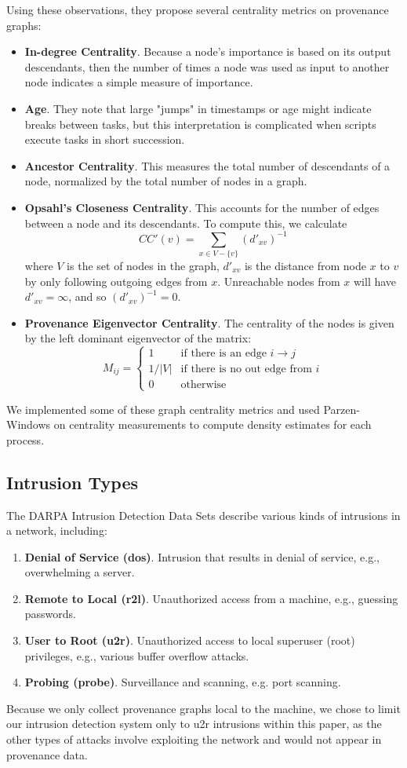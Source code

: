\documentclass[10pt,twocolumn]{article}
\begin{document}
Using these observations, they propose several centrality metrics on provenance graphs:
\begin{itemize}
\item \textbf{In-degree Centrality}. Because a node's importance is based on its output descendants, then the number of times a node was used as input to another node indicates a simple measure of importance.
\item \textbf{Age}. They note that large "jumps" in timestamps or age might indicate breaks between tasks, but this interpretation is complicated when scripts execute tasks in short succession.
\item \textbf{Ancestor Centrality}. This measures the total number of descendants of a node, normalized by the total number of nodes in a graph.
\item \textbf{Opsahl's Closeness Centrality}. This accounts for the number of edges between a node and its descendants. To compute this, we calculate
$$CC'(v) = \sum_{x \in V -  \{v\}} (d'_{xv})^{-1}$$
where $V$ is the set of nodes in the graph, $d'_{xv}$ is the distance from node $x$ to $v$ by only following outgoing edges from $x$. Unreachable nodes from $x$ will have $d'_{xv} = \infty$, and so $(d'_{xv})^{-1} = 0$.
\item \textbf{Provenance Eigenvector Centrality}. The centrality of the nodes is given by the left dominant eigenvector of the matrix:
$$M_{ij} =
\begin{cases}
1 & \text{if there is an edge } i \to j \\
1/|V| & \text{if there is no out edge from } i \\
0 & \text{otherwise}
\end{cases}
$$
\end{itemize}
We implemented some of these graph centrality metrics and used Parzen-Windows on centrality measurements to compute density estimates for each process.

\subsection{Intrusion Types}

The DARPA Intrusion Detection Data Sets \cite{darpa} describe various kinds of intrusions in a network, including:
\begin{enumerate}
\item {\bf Denial of Service (dos)}. Intrusion that results in denial of service, e.g., overwhelming a server.
\item {\bf Remote to Local (r2l)}. Unauthorized access from a machine, e.g., guessing passwords.
\item {\bf User to Root (u2r)}. Unauthorized access to local superuser (root) privileges, e.g., various buffer overflow attacks.
\item {\bf Probing (probe)}. Surveillance and scanning, e.g. port scanning.
\end{enumerate}
Because we only collect provenance graphs local to the machine, we chose to limit our intrusion detection system only to u2r intrusions within this paper, as the other types of attacks involve exploiting the network and would not appear in provenance data.
\end{document}
